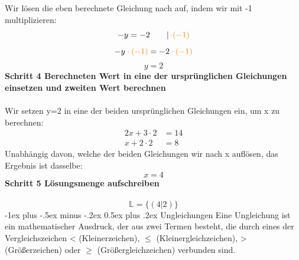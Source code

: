 \documentclass[a4paper,10pt]{article}
\makeatletter
\renewcommand{\section}{\@startsection{section}{1}{0mm}%
                                {-1ex plus -.5ex minus -.2ex}%
                                {0.5ex plus .2ex}%
                                {\normalfont\large\bfseries}}
\makeatother
\begin{document}
\begin{multicols}{3}
    Wir lösen die eben berechnete Gleichung nach auf, indem wir mit -1 multiplizieren:
    \[-y = -2 \qquad |\, {\color{orange}\cdot (-1)}\]
    \[-y {\color{orange} \: \cdot \: (-1)} = -2 {\color{orange} \: \cdot \: (-1)}\]
    \[y = 2\]
    \textbf{Schritt 4 Berechneten Wert in eine der ursprünglichen Gleichungen einsetzen und zweiten Wert berechnen}\\~\\
    Wir setzen y=2 in eine der beiden ursprünglichen Gleichungen ein, um x zu berechnen:
    \begin{align*} 2x + 3 \cdot 2 &= 14 \\ x + 2 \cdot 2 &= 8 \end{align*}
    Unabhängig davon, welche der beiden Gleichungen wir nach x auflösen, das Ergebnis ist dasselbe:
    \[x = 4\]
    \textbf{Schritt 5 Lösungsmenge aufschreiben}\\~\\
    \[\mathbb{L} = \{(4|2)\}\]
    \section{Ungleichungen}
    Eine Ungleichung ist ein mathematischer Ausdruck, der aus zwei Termen besteht, die durch eines der Vergleichszeichen < (Kleinerzeichen), $\leq$ (Kleinergleichzeichen),
    > (Größerzeichen) oder $\geq$ (Größergleichzeichen) verbunden sind.

\end{multicols}
\end{document}
